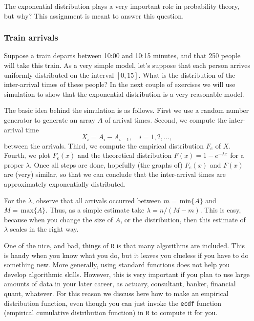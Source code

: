 \documentclass[a4paper]{article}
\theoremstyle{definition}
\renewcommand{\max}[1]{\,\mathrm{max}\{#1\}}
\renewcommand{\min}[1]{\,\mathrm{min}\{#1\}}
\newcommand{\1}[1]{\,I_{#1}} %
\begin{document}
The exponential distribution plays a very important role in probability theory, but why? This assignment is meant to answer this question.  

\subsubsection{Train arrivals}
\label{sec:org25e266e}

Suppose a train departs between 10:00 and 10:15 minutes, and that 250 people will take this train.
As a very simple model, let's suppose that each person arrives uniformly distributed on the interval \([0,15]\).
What is the distribution of the inter-arrival times of these people?
In the next couple of exercises we will use simulation to show that the exponential distribution is a very reasonable model.

The basic idea behind the simulation is as follows. First we use a random number generator to generate an array \(A\) of arrival times. Second, we compute the inter-arrival time
\begin{equation}
\label{eq:1}
X_{i} = A_{i} - A_{i-1},\quad i = 1,2, \ldots,
\end{equation}
between the arrivals.
Third, we compute the empirical distribution \(F_{e}\) of \(X\).
Fourth, we plot  \(F_{e}(x)\) and  the theoretical distribution \(F(x) = 1-e^{-\lambda x}\) for a proper \(\lambda\). 
Once all steps are done, hopefully (the graphs of) \(F_{e}(x)\) and \(F(x)\) are (very) similar, so that we can conclude that the inter-arrival times are approximately exponentially distributed. 

For the \(\lambda\), observe that all arrivals occurred between \(m= \min A\) and \(M=\max A\). Thus, as a simple estimate take \(\lambda = n/(M-m)\). This is easy, because when you change the size of \(A\), or the distribution, then this estimate of \(\lambda\) scales in the right way.


One of the nice, and bad, things of \texttt{R} is that many algorithms are included.
This is handy when you know what you do, but it leaves you clueless  if you have to do something new.
More generally, using standard functions does not help you develop algorithmic skills.
However, this is very important if you plan to use large amounts of data in your later career, as actuary, consultant, banker, financial quant, whatever.
For this reason we discuss here how to make an empirical distribution function, even though you can just invoke the \texttt{ecdf} function (empirical cumulative distribution function) in \texttt{R} to compute it for you.
\end{document}
